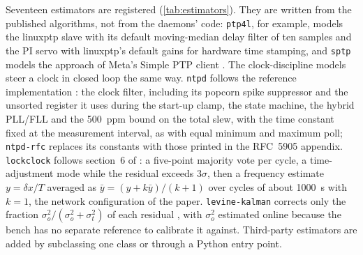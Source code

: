 \documentclass[11pt,a4paper]{article}
\begin{document}
Seventeen estimators are registered (\cref{tab:estimators}). They are written from the published
algorithms, not from the daemons' code: \texttt{ptp4l}, for example, models the linuxptp slave with its
default moving-median delay filter of ten samples and the PI servo with linuxptp's default gains for
hardware time stamping, and \texttt{sptp} models the approach of Meta's Simple PTP client
\citep{fbsptp2024}. The clock-discipline models steer a clock in closed loop the same way. \texttt{ntpd}
follows the reference implementation \citep{ntploopfilter,ntpproto}: the clock filter, including its
popcorn spike suppressor and the unsorted register it uses during the start-up clamp, the state machine,
the hybrid PLL/FLL and the 500~ppm bound on the total slew, with the time constant fixed at the
measurement interval, as with equal minimum and maximum poll; \texttt{ntpd-rfc} replaces its
constants with those printed in the RFC~5905 appendix. \texttt{lockclock} follows section~6 of
\citep{levine2020}: a five-point majority vote per cycle, a time-adjustment mode while the residual
exceeds $3\sigma$, then a frequency estimate $y = \delta x/T$ averaged as $\bar y = (y + k\bar y)/(k+1)$
over cycles of about 1000~s with $k = 1$, the network configuration of the paper.
\texttt{levine-kalman} corrects only the fraction $\sigma_o^2/(\sigma_o^2 + \sigma_t^2)$ of each residual
\citep{levine2011kalman}, with $\sigma_o^2$ estimated online because the bench has no separate
reference to calibrate it against. Third-party estimators are added by subclassing one class or through a Python entry
point.
\end{document}
